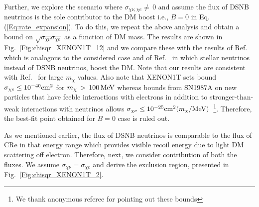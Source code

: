 \documentclass[11pt,prd,twocolumn,nofootinbib,reprint,superscriptaddress,longbibliography,colorlinks=true,citecolor=blue]{revtex4-1}
\begin{document}
Further, we explore the scenario where $\sigma_{\chi \nu,\chi e}\neq\,0$ and assume the flux of DSNB neutrinos is the sole contributor to the DM boost i.e., $B = 0$ in Eq.(\ref{Eq:rate_expansion}). To do this, we repeat the above analysis and obtain a bound on $\sqrt{\sigma_{\chi \nu} \sigma_{\chi e}}$ as a function of DM mass. The results are shown in Fig.~\ref{Fig:chisqr_XENON1T_12} and we compare these with the results of Ref.~\cite{Das:2021lcr} which is analogous to the considered case and of Ref.~\cite{Jho:2021rmn} in which stellar neutrinos instead of DSNB neutrinos, boost the DM. Note that our results are consistent with Ref.~\cite{Das:2021lcr} for large $m_\chi$ values. { Also note that XENON1T sets bound $\sigma_{\chi e}\leq10^{-40}{\rm cm}^2$ for $m_\chi\,>\,100\,{\rm MeV}$ whereas bounds from SN1987A on new particles that have feeble interactions with electrons in addition to stronger-than-weak interactions with neutrinos allows $\sigma_{\chi\nu}\leq 10^{-25}{\rm cm}^2(m_\chi/{\rm MeV})$~\cite{Boehm:2013jpa,Bertoni:2014mva}\footnote{We thank anonymous referee  for pointing out these bounds}. Therefore, the best-fit point obtained for $B = 0$ case is ruled out.}

As we mentioned earlier, the flux of DSNB neutrinos is comparable to the flux of CRe in that energy range which provides visible recoil energy due to light DM scattering off electron. Therefore, next, we consider contribution of both the fluxes. We assume $\sigma_{\chi \nu} = \sigma_{\chi e}$  and derive the exclusion region, presented in Fig.~\ref{Fig:chisqr_XENON1T_2}. 
\end{document}
